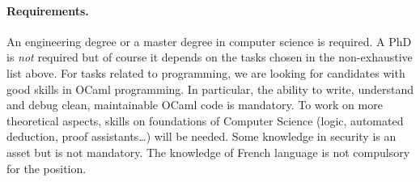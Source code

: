 \documentclass[10pt,a4paper]{article}
\begin{document}
\paragraph*{Requirements.} 

An engineering degree or a master degree in computer science is required.
A PhD is \emph{not} required but of course it depends on the tasks
chosen in the non-exhaustive list above.
For tasks related to programming, we are looking for candidates with
good skills in OCaml programming. In 
particular, the ability to write, understand and debug clean, maintainable 
OCaml code is mandatory. To work on more theoretical aspects, skills
on foundations of Computer Science (logic, automated
deduction, proof assistants\ldots) will be needed.
Some knowledge in security is an asset but is not mandatory.
The knowledge of French language is not compulsory for the position.



\end{document}
